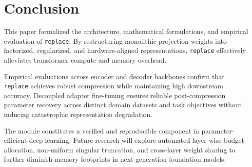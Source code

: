 \section{Conclusion}
This paper formalized the architecture, mathematical formulations, and empirical evaluation of \texttt{replace}. By restructuring monolithic projection weights into factorized, regularized, and hardware-aligned representations, \texttt{replace} effectively alleviates transformer compute and memory overhead.

Empirical evaluations across encoder and decoder backbones confirm that \texttt{replace} achieves robust compression while maintaining high downstream accuracy. Decoupled adapter fine-tuning ensures reliable post-compression parameter recovery across distinct domain datasets and task objectives without inducing catastrophic representation degradation.

The module constitutes a verified and reproducible component in parameter-efficient deep learning. Future research will explore automated layer-wise budget allocation, non-uniform singular truncation, and cross-layer weight sharing to further diminish memory footprints in next-generation foundation models.
